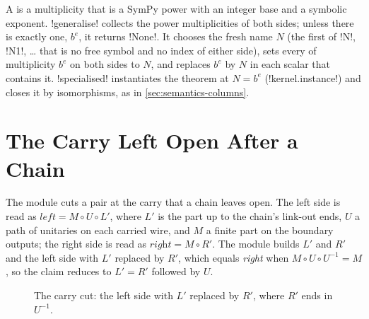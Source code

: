 \noindent A  is a \bbox{} multiplicity that is a SymPy power with an integer base and a symbolic exponent. \py!generalise! collects the power multiplicities of both sides; unless there is exactly one, $b^e$, it returns \py!None!. It chooses the fresh name $N$ (the first of \code!N!, \code!N1!, \ldots{} that is no free symbol and no \bbox{} index of either side), sets every \bbox{} of multiplicity $b^e$ on both sides to $N$, and replaces $b^e$ by $N$ in each scalar that contains it. \py!specialised! instantiates the theorem at $N=b^e$ (\py!kernel.instance!) and closes it by isomorphisms, as in \cref{sec:semantics-columns}.

\section{The Carry Left Open After a Chain}\label{sec:semantics-carry}

The module  cuts a pair at the carry that a chain \bbox{} leaves open. The left side is read as $\textit{left}=M\circ U\circ L'$, where $L'$ is the part up to the chain's link-out ends, $U$ a path of unitaries on each carried wire, and $M$ a finite part on the boundary outputs; the right side is read as $\textit{right}=M\circ R'$. The module builds $L'$ and $R'$ and the left side with $L'$ replaced by $R'$, which equals \textit{right} when $M\circ U\circ U^{-1}=M$, so the claim reduces to $L'=R'$ followed by $U$.

\begin{figure}[H]
\centering
{}
\caption{The carry cut: the left side with $L'$ replaced by $R'$, where $R'$ ends in $U^{-1}$.}\label{fig:semantics-carry}
\end{figure}

